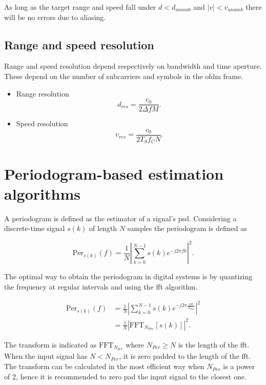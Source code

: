         As long as the target range and speed fall under $d < d_{unamb}$ and $|v| < v_{unamb}$ there will be no errors due to aliasing.
        
    \subsection{Range and speed resolution}
    
        Range and speed resolution depend respectively on bandwidth and time aperture. These depend on the number of subcarriers and symbols in the \gls{ofdm} frame.
        
        \begin{itemize}
            \item Range resolution
            $$ d_{res} =  \frac{c_0}{2\Delta f M}. $$
            \item Speed resolution
            $$ v_{res} = \frac{c_0}{2 T_S f_C N}. $$
        \end{itemize}
        

        
\section{Periodogram-based estimation algorithms}
    
    A periodogram is defined as the estimator of a signal's \gls{psd}.
    Considering a discrete-time signal $s(k)$ of length $N$ samples the periodogram is defined as
    
    \begin{equation*}
        \text{Per}_{s(k)}(f) = \frac{1}{N}\left| \sum_{k=0}^{N-1} s(k)e^{-j2\pi fk}\right|^2.
    \end{equation*}

    The optimal way to obtain the periodogram in digital systems is by quantizing the frequency at regular intervals and using the \gls{fft} algorithm.

    \begin{align*}
        \text{Per}_{s(k)}(f) &= \frac{1}{N}\left| \sum_{k=0}^{N-1} s(k)e^{-j2\pi \frac{nk}{N_{Per}}}\right|^2 \\
        &= \frac{1}{N}\left| \text{FFT}_{N_{Per}}[s(k)]\right|^2.
    \end{align*}
    
    
    The transform is indicated as $\text{FFT}_{N_{per}}$ where $N_{Per} \geq N$ is the length of the \gls{fft}. When the input signal has $N < N_{Per}$, it is zero padded to the length of the \gls{fft}.
    The transform can be calculated in the most efficient way when $N_{Per}$ is a power of 2, hence it is recommended to zero pad the input signal to the closest one.

